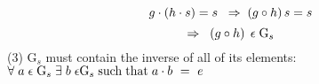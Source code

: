 \documentclass[11pt,oneside,a4paper]{article}
\begin{document}
$$ g \cdot \left( h \cdot s \right) = s \hspace{2mm}\Rightarrow \hspace{1mm} \left( g \circ h \right) s = s$$
$$\Rightarrow \hspace{2mm} \left(g \circ h \right) \hspace{1mm} \epsilon \hspace{1mm} \mathrm{G}_s $$
\indent (3) $ \mathrm{G}_s $ must contain the inverse of all of its elements: $\forall \hspace{1mm} a \hspace{1mm}\epsilon \hspace{1mm} \mathrm{G}_s \hspace{1mm} \exists \hspace{1mm} b \hspace{1mm} \epsilon \mathrm{G}_s \hspace{1mm} \mathrm{such \hspace{1mm} that} \hspace{1mm} a \cdot b~=~e$
\end{document}
